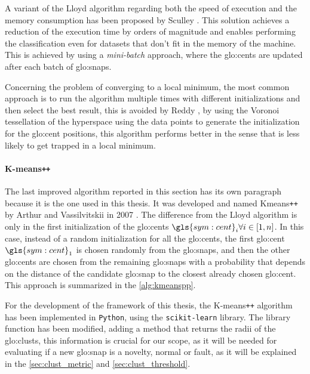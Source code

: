 A variant of the Lloyd algorithm regarding both the speed of execution and the memory consumption has been proposed by Sculley \cite{Sculley2010}. This solution achieves a reduction of the execution time by orders of magnitude and enables performing the classification even for datasets that don't fit in the memory of the machine. This is achieved by using a \emph{mini-batch} approach, where the {\gls{glo:cent}}s are updated after each batch of {\gls{glo:snap}}s.

Concerning the problem of converging to a local minimum, the most common approach is to run the algorithm multiple times with different initializations and then select the best result, this is avoided by Reddy \cite{Vornoi_Kmeans}, by using the Voronoi tessellation of the hyperspace using the data points to generate the initialization for the {\gls{glo:cent}} positions, this algorithm performs better in the sense that is less likely to get trapped in a local minimum.


\paragraph{K-means\texttt{++}} 
The last improved algorithm reported in this section has its own paragraph because it is the one used in this thesis. It was developed and named Kmeans\texttt{++} by Arthur and Vassilvitskii in 2007 \cite{Kmeanspp}. The difference from the Lloyd algorithm is only in the first initialization of the {\gls{glo:cent}}s $\gls{sym:cent}_i \forall i \in [1,n]$. In this case, instead of a random initialization for all the {\gls{glo:cent}}s, the first {\gls{glo:cent}} $\gls{sym:cent}_1$ is chosen randomly from the {\gls{glo:snap}}s, and then the other {\gls{glo:cent}}s are chosen from the remaining {\gls{glo:snap}}s with a probability that depends on the distance of the candidate {\gls{glo:snap}} to the closest already chosen {\gls{glo:cent}}. This approach is summarized in the \autoref{alg:kmeanspp}.

For the development of the framework of this thesis, the K-means\texttt{++} algorithm has been implemented in \texttt{Python}, using the \texttt{scikit-learn} library. The library function has been modified, adding a method that returns the radii of the \gls{glo:clust}s, this information is crucial for our scope, as it will be needed for evaluating if a new {\gls{glo:snap}} is a novelty, normal or fault, as it will be explained in the \autoref{sec:clust_metric} and \autoref{sec:clust_threshold}.


